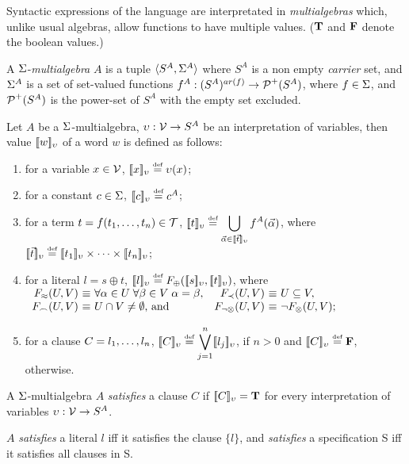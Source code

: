 Syntactic expressions of the language are interpretated in {\em multialgebras}
\cite{Kap,Hus,Mich} which, unlike usual algebras, allow
functions to have multiple values.
(\(\true\) and  \(\false\) denote the boolean values.)
%
\begin{definition}
A $\Funcs$-{\em multialgebra} $A$ is a tuple \(\<S^A,\Funcs^A\>\) where
$S^A$ is a non empty {\em carrier} set, and $\Funcs^A$ is a set of
set-valued functions \(f^A: (S^A)^{ar(f)}\to\C P^+(S^A)\), where \(f\in
\Funcs\), and \(\C P^+(S^A)\) is the power-set of \(S^A\) with the empty set
excluded.
\end{definition}
%
\begin{definition} \label {def:semantics}
Let $A$ be a \(\Funcs\)-multialgebra, \(\upsilon:\Vars \to S^A\) be an
interpretation of variables, then value \(\Value w\) of a word $w$ is
defined as follows:
\begin{enumerate}\smallerspaces
\item for a variable \(x\in\Vars\), \(\Value x \Def \upsilon(x)\);
  \label {semantics-v}
\item for a constant $c\in\Funcs$, \(\Value c \Def c^A\);
\item for a term \(t=f(\List tn,)\in \Terms\),  \(\displaystyle
  \Value t \Def \bigcup_{\vec{\alpha} \in \Value{\vec t}}
  f^A(\vec{\alpha})\), where \(\Value{\vec{t}}\Def \Value{t_1}\times \cdots
  \times \Value{t_n}\); 
  \label {semantics1}
\item for a literal \(l=s\oplus t\), \(\Value l \Def
  F_\oplus(\Value s, \Value t)\), where
  \vspace{1ex}\newline \(
  \begin{array}{r@{\ \equiv\ } l@{\quad}r@{\ \equiv\ } l}
      F_{\Eq}(U,V) & \forall \alpha\in U\; \forall \beta\in V\;\alpha=\beta, &
      F_{\Incl}(U,V) & U\subseteq V,\\
      F_{\Int}(U,V) & U\cap V\neq \es \mbox{, and } &
      F_{\neg\otimes}(U,V) & \neg F_\otimes(U,V);
  \end{array}\)
  \label {semantics3}
\item for a clause \(C=\List ln,\), \(\Value C \Def \displaystyle
  \bigvee_{j=1}^n \Value{l_j} \), if \(n>0\) and \(\Value C \Def \false\),
  otherwise.  
  \label {semantics4}
\vspace{-1ex}
\end{enumerate}
\end{definition}
%
\begin{definition}\label {def:satisfies}
A \(\Funcs\)-multialgebra $A$ {\em satisfies} a clause $C$ if \(\Value C =
\true\) for every interpretation of variables \(\upsilon:\Vars \to S^A\).

$A$ {\em satisfies} a literal $l$ iff it satisfies the clause
\(\{ l\}\), and {\em satisfies} a specification \C S iff it satisfies all
clauses in \C S.
\end{definition}

